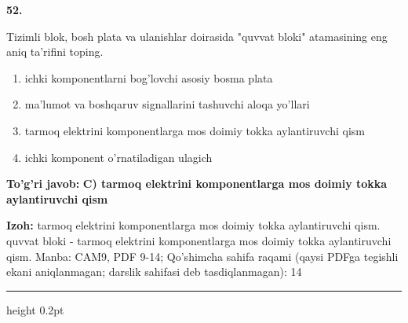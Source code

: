 \documentclass[10pt,a4paper]{article}
\begin{document}
{\bfseries\sffamily\color{ink} 52.}
\par
Tizimli blok, bosh plata va ulanishlar doirasida "quvvat bloki" atamasining eng aniq ta'rifini toping.
\begin{enumerate}[label=\Alph*),leftmargin=9mm]
\item ichki komponentlarni bog'lovchi asosiy bosma plata
\item ma'lumot va boshqaruv signallarini tashuvchi aloqa yo'llari
\item tarmoq elektrini komponentlarga mos doimiy tokka aylantiruvchi qism
\item ichki komponent o'rnatiladigan ulagich
\end{enumerate}
\begin{tcolorbox}[enhanced,breakable,colback=teal!4,colframe=teal!60!black,boxrule=0.45pt,arc=1.2mm,left=2.7mm,right=2.7mm,top=1.8mm,bottom=1.8mm,before skip=2mm,after skip=2mm]
{\bfseries\sffamily\color{teal}To'g'ri javob:} \textbf{C) tarmoq elektrini komponentlarga mos doimiy tokka aylantiruvchi qism}
\par\smallskip
{\bfseries Izoh:} tarmoq elektrini komponentlarga mos doimiy tokka aylantiruvchi qism. quvvat bloki - tarmoq elektrini komponentlarga mos doimiy tokka aylantiruvchi qism. Manba: CAM9, PDF 9-14; Qo'shimcha sahifa raqami (qaysi PDFga tegishli ekani aniqlanmagan; darslik sahifasi deb tasdiqlanmagan): 14
\end{tcolorbox}
\vspace{2mm}\hrule height 0.2pt\vspace{3mm}
\end{document}
